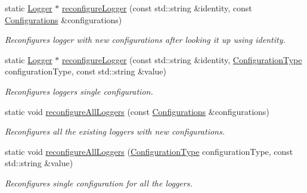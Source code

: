 \begin{DoxyCompactItemize}
\mbox{\label{classel_1_1_loggers_a105f776fe19cb7fa2fccd2993d9f7a7c}} 
static \hyperlink{classel_1_1_logger}{Logger} $\ast$ \hyperlink{classel_1_1_loggers_a105f776fe19cb7fa2fccd2993d9f7a7c}{reconfigure\+Logger} (const std\+::string \&identity, const \hyperlink{classel_1_1_configurations}{Configurations} \&configurations)
\begin{DoxyCompactList}\small\item\em Reconfigures logger with new configurations after looking it up using identity. \end{DoxyCompactList}\item 
\mbox{\label{classel_1_1_loggers_aef49fdae329cefcc1c01428568dced4b}} 
static \hyperlink{classel_1_1_logger}{Logger} $\ast$ \hyperlink{classel_1_1_loggers_aef49fdae329cefcc1c01428568dced4b}{reconfigure\+Logger} (const std\+::string \&identity, \hyperlink{namespaceel_a281f5db6d6163678bc68a8b23b59e124}{Configuration\+Type} configuration\+Type, const std\+::string \&value)
\begin{DoxyCompactList}\small\item\em Reconfigures logger\textquotesingle{}s single configuration. \end{DoxyCompactList}\item 
\mbox{\label{classel_1_1_loggers_ac834df0f5e9e3dab18e70321a2543af7}} 
static void \hyperlink{classel_1_1_loggers_ac834df0f5e9e3dab18e70321a2543af7}{reconfigure\+All\+Loggers} (const \hyperlink{classel_1_1_configurations}{Configurations} \&configurations)
\begin{DoxyCompactList}\small\item\em Reconfigures all the existing loggers with new configurations. \end{DoxyCompactList}\item 
\mbox{\label{classel_1_1_loggers_a1ebd33bc0208b430f41508e34509c7c9}} 
static void \hyperlink{classel_1_1_loggers_a1ebd33bc0208b430f41508e34509c7c9}{reconfigure\+All\+Loggers} (\hyperlink{namespaceel_a281f5db6d6163678bc68a8b23b59e124}{Configuration\+Type} configuration\+Type, const std\+::string \&value)
\begin{DoxyCompactList}\small\item\em Reconfigures single configuration for all the loggers. \end{DoxyCompactList}\item 

\end{DoxyCompactItemize}
